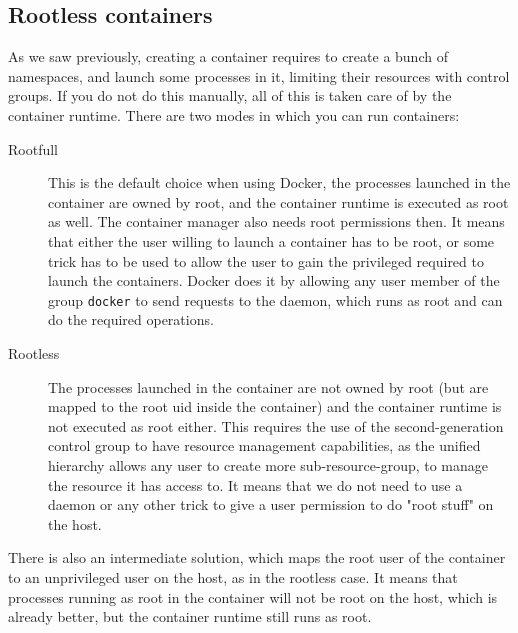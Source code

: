 \subsection{Rootless containers}
As we saw previously, creating a container requires to create a bunch of namespaces, and launch some processes in it, limiting their resources with control groups.  If you do not do this manually, all of this is taken care of by the container runtime.  There are two modes in which you can run containers:
\begin{description}
  \item[Rootfull]  This is the default choice when using Docker, the processes launched in the container are owned by root, and the container runtime is executed as root as well.  The container manager also needs root permissions then.  It means that either the user willing to launch a container has to be root, or some trick has to be used to allow the user to gain the privileged required to launch the containers.  Docker does it by allowing any user member of the group \texttt{docker} to send requests to the daemon, which runs as root and can do the required operations.
  \item[Rootless] The processes launched in the container are not owned by root (but are mapped to the root uid inside the container) and the container runtime is not executed as root either.  This requires the use of the second-generation control group to have resource management capabilities, as the unified hierarchy allows any user to create more sub-resource-group, to manage the resource it has access to.  It means that we do not need to use a daemon or any other trick to give a user permission to do "root stuff" on the host.
\end{description}
There is also an intermediate solution, which maps the root user of the container to an unprivileged user on the host, as in the rootless case.  It means that processes running as root in the container will not be root on the host, which is already better, but the container runtime still runs as root.

